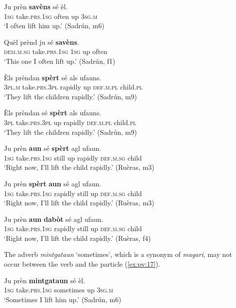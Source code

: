 \ea
\label{ex:pv:10}
\gll    Ju prèn \textbf{savèns} sé èl.\\
     \textsc{1sg} take.\textsc{prs.1sg} often up \textsc{3sg.m}\\
\glt `I often lift him up.' (Sadrún, m6)
\z

\ea
\label{ex:pv:11}
\gll    Quèl prènd ju sé \textbf{savèns}.\\
     \textsc{dem.m.sg} take.\textsc{prs.1sg} \textsc{1sg} up often\\
\glt `This one I often lift up.' (Sadrún, f1)
\z

\ea
\label{ex:pv:12}
\gll Èls prèndan \textbf{spèrt} sé als ufauns.   \\
\textsc{3pl.m} take.\textsc{prs.3pl} rapidly up \textsc{def.m.pl} child.\textsc{pl}  \\
\glt `They lift the children rapidly.' (Sadrún, m9)
\z

\ea
\label{ex:pv:13}
\gll Èls prèndan sé \textbf{spèrt} als ufauns.   \\
   \textsc{3pl} take.\textsc{prs.3pl} up rapidly \textsc{def.m.pl} child.\textsc{pl}  \\
\glt `They lift the children rapidly.' (Sadrún, m9)
\z

\ea
\label{ex:pv:14}
\gll Ju prèn \textbf{aun} sé \textbf{spèrt} agl ufaun.    \\
    \textsc{1sg} take.\textsc{prs.1sg} still up rapidly \textsc{def.m.sg} child \\
\glt `Right now, I’ll lift the child rapidly.' (Ruèras, m3)
\z

\ea
\label{ex:pv:15}
\gll Ju prèn \textbf{spèrt} \textbf{aun} sé agl ufaun.    \\
    \textsc{1sg} take.\textsc{prs.1sg} rapidly still up \textsc{def.m.sg} child \\
\glt `Right now, I’ll lift the child rapidly.' (Ruèras, m3)
\z

\ea
\label{ex:pv:16}
\gll Ju prèn \textbf{aun} \textbf{dabòt} sé agl ufaun.    \\
    \textsc{1sg} take.\textsc{prs.1sg} rapidly still up \textsc{def.m.sg} child \\
\glt `Right now, I’ll lift the child rapidly.' (Ruèras, f4)
\z

The adverb \textit{mintgataun} `sometimes', which is a synonym of \textit{magari}, may not occur between the verb and the particle (\ref{ex:pv:17}).

\ea
\label{ex:pv:17}
\gll   *Ju prèn \textbf{mintgataun} sé èl. \\
     \textsc{1sg} take.\textsc{prs.1sg} sometimes up \textsc{3sg.m}\\
\glt `Sometimes I lift him up.' (Sadrún, m6)
\z

